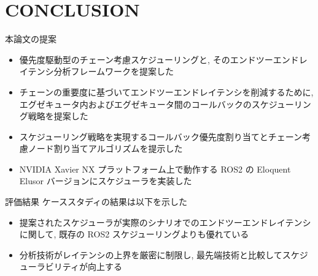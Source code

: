 
\section{CONCLUSION}
\label{sec: conslusion}

\begin{frame}{本論文の提案}
    \begin{itemize}
        \item 優先度駆動型のチェーン考慮スケジューリングと, そのエンドツーエンドレイテンシ分析フレームワークを提案した
        \item チェーンの重要度に基づいてエンドツーエンドレイテンシを削減するために, エグゼキュータ内およびエグゼキュータ間のコールバックのスケジューリング戦略を提案した
        \item スケジューリング戦略を実現するコールバック優先度割り当てとチェーン考慮ノード割り当てアルゴリズムを提示した
        \item NVIDIA Xavier NX プラットフォーム上で動作する ROS2 の Eloquent Elusor バージョンにスケジューラを実装した
    \end{itemize}
\end{frame}

\begin{frame}{評価結果}
    ケーススタディの結果は以下を示した
    \begin{itemize}
        \item 提案されたスケジューラが実際のシナリオでのエンドツーエンドレイテンシに関して, 既存の ROS2 スケジューリングよりも優れている
        \item 分析技術がレイテンシの上界を厳密に制限し, 最先端技術と比較してスケジューラビリティが向上する
    \end{itemize}
\end{frame}


